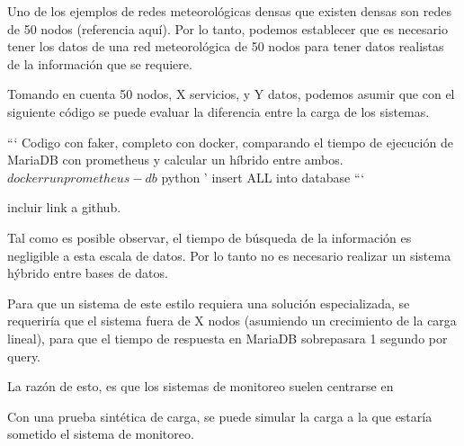 Uno de los ejemplos de redes meteorológicas densas que existen densas son redes de 50 nodos (referencia aquí). Por lo tanto, podemos establecer que es necesario tener los datos de una red meteorológica de 50 nodos para tener datos realistas de la información que se requiere.

Tomando en cuenta 50 nodos, X servicios, y Y datos, podemos asumir que con el siguiente código se puede evaluar la diferencia entre la carga de los sistemas.

```
Codigo con faker, completo con docker, comparando el tiempo de ejecución de MariaDB con prometheus y calcular un híbrido entre ambos.
$ docker run prometheus-db
$ python '
insert ALL into database
```

incluir link a github.

Tal como es posible observar, el tiempo de búsqueda de la información es negligible a esta escala de datos. Por lo tanto no es necesario realizar un sistema hýbrido entre bases de datos.

Para que un sistema de este estilo requiera una solución especializada, se requeriría que el sistema fuera de X nodos (asumiendo un crecimiento de la carga lineal), para que el tiempo de respuesta en MariaDB sobrepasara 1 segundo por query.



La razón de esto, es que los sistemas de monitoreo suelen centrarse en

Con una prueba sintética de carga, se puede simular la carga a la que estaría sometido el sistema de monitoreo.



